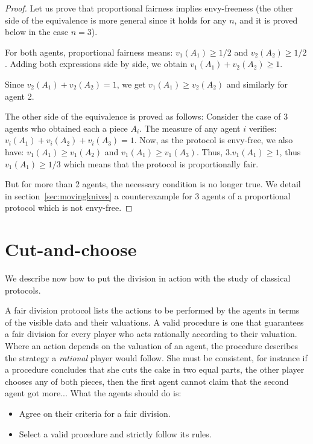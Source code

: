 \begin{proof}
Let us prove that proportional fairness implies envy-freeness (the other side of the equivalence is more general since it holds for any $n$, 
and it is proved below in the case $n=3$).

For both agents, proportional fairness means: $v_1(A_1) \geq 1/2$ and $v_2(A_2) \geq 1/2$.
Adding both expressions side by side, we obtain $v_1(A_1)+v_2(A_2) \geq 1$.

Since $v_2(A_1) + v_2(A_2) = 1$, we get 
$v_1(A_1) \geq v_2(A_2)$ and similarly for agent 2. 
\bigskip

The other side of the equivalence is proved as follows: 
Consider the case of $3$ agents who obtained each a piece $A_i$.
The measure of any agent $i$ verifies: $v_i(A_1)+v_i(A_2)+v_i(A_3) = 1$.
Now, as the protocol is envy-free, we also have: $v_1(A_1) \geq v_1(A_2)$ and $v_1(A_1) \geq v_1(A_3)$.
Thus, $3.v_1(A_1) \geq 1$, thus $v_1(A_1) \geq 1/3$ which means that the protocol is proportionally fair. 
\bigskip

But for more than 2 agents, the necessary condition is no longer true.
We detail in section~\ref{sec:movingknives} a counterexample for 3 agents of a proportional protocol which is not envy-free.
\end{proof}


\section{Cut-and-choose}

We describe now how to put the division in action with the study of classical protocols.

A fair division protocol lists the actions to be performed by the agents in terms of the visible data and their valuations. 
A valid procedure is one that guarantees a fair division for every player who acts rationally according to their valuation. 
Where an action depends on the valuation of an agent, the procedure describes the strategy a \textit{rational} player would follow. 
She must be consistent,
for instance if a procedure concludes that she cuts the cake in two equal parts, the other player chooses any of both pieces, 
then the first agent cannot claim that the second agent got more...
What the agents should do is:
\begin{itemize}
\item Agree on their criteria for a fair division.
\item Select a valid procedure and strictly follow its rules.
\end{itemize}


